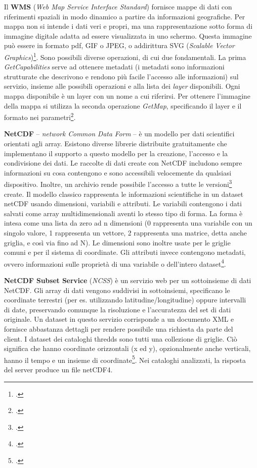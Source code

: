 \documentclass[./main.tex]{subfiles}
\begin{document}
Il \textbf{WMS} (\textit{Web Map Service Interface Standard}) fornisce mappe di dati con riferimenti spaziali in modo dinamico a partire da informazioni geografiche. Per mappa non si intende i dati veri e propri, ma una rappresentazione sotto forma di immagine digitale adatta ad essere visualizzata in uno schermo. Questa immagine può essere in formato pdf, GIF o JPEG, o addirittura SVG (\textit{Scalable Vector Graphics})\footcite[5]{ogc-wms-specs}. Sono possibili diverse operazioni, di cui due fondamentali. La prima \textit{GetCapabilities} serve ad ottenere metadati (i metadati sono informazioni strutturate che descrivono e rendono più facile l'accesso alle informazioni) sul servizio, insieme alle possibili operazioni e alla lista dei \textit{layer} disponibili. Ogni mappa disponibile è un layer con un nome a cui riferirsi. Per ottenere l'immagine della mappa si utilizza la seconda operazione \textit{GetMap}, specificando il layer e il formato nei parametri\footcite[21-38]{ogc-wms-specs}.\par

\textbf{NetCDF} -- \textit{network Common Data Form} -- è un modello per dati scientifici orientati agli array. Esistono diverse librerie distribuite gratuitamente che implementano il supporto a questo modello per la creazione, l'accesso e la condivisione dei dati. Le raccolte di dati create con NetCDF includono sempre informazioni su cosa contengono e sono accessibili velocemente da qualsiasi dispositivo. Inoltre, un archivio rende possibile l'accesso a tutte le versioni\footcite[7]{ogc-netcdf-specs} create.  Il modello classico rappresenta le informazioni scientifiche in un dataset netCDF usando dimensioni, variabili e attributi. Le variabili contengono i dati salvati come array multidimensionali aventi lo stesso tipo di forma. La forma è intesa come una lista da zero ad n dimensioni (0 rappresenta una variabile con un singolo valore, 1 rappresenta un vettore, 2 rappresenta una matrice, detta anche griglia, e così via fino ad N). Le dimensioni sono inoltre usate per le griglie comuni e per il sistema di coordinate. Gli attributi invece contengono metadati, ovvero informazioni sulle proprietà di una variabile o dell'intero dataset\footcite[10-15]{ogc-netcdf-specs}.\par

\textbf{NetCDF Subset Service }(\textit{NCSS}) è un servizio web per un sottoinsieme di dati NetCDF.  Gli array di dati vengono suddivisi in sottoinsiemi, specificano le coordinate terrestri (per es. utilizzando latitudine/longitudine) oppure intervalli di date, preservando comunque la risoluzione e l'accuratezza del set di dati originale. Un dataset in questo servizio corrisponde a un documento XML e fornisce abbastanza dettagli per rendere possibile una richiesta da parte del client. I dataset dei cataloghi thredds sono tutti una collezione di griglie. Ciò significa che hanno coordinate orizzontali (x ed y), opzionalmente anche verticali, hanno il tempo e un insieme di coordinate\footcite[\url{https://docs.unidata.ucar.edu/tds/current/userguide/netcdf_subset_service_ref.html}]{website-unidata-ucar-edu}. Nei cataloghi analizzati, la risposta del server produce un file netCDF4.\par
\end{document}
